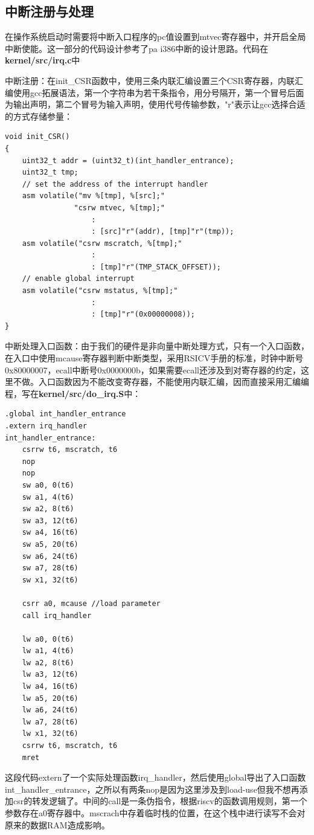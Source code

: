 \documentclass[]{article}
\begin{document}
  \subsection{中断注册与处理}
  在操作系统启动时需要将中断入口程序的pc值设置到mtvec寄存器中，并开启全局中断使能。这一部分的代码设计参考了pa i386中断的设计思路。代码在\textbf{kernel/src/irq.c}中
  
  中断注册：在init\_CSR函数中，使用三条内联汇编设置三个CSR寄存器，内联汇编使用gcc拓展语法，第一个字符串为若干条指令，用分号隔开，第一个冒号后面为输出声明，第二个冒号为输入声明，使用代号传输参数，"r"表示让gcc选择合适的方式存储参量：
  \begin{lstlisting}[style=c-style]
void init_CSR()
{
    uint32_t addr = (uint32_t)(int_handler_entrance);
    uint32_t tmp;
    // set the address of the interrupt handler
    asm volatile("mv %[tmp], %[src];"
                "csrw mtvec, %[tmp];"
                    :
                    : [src]"r"(addr), [tmp]"r"(tmp));
    asm volatile("csrw mscratch, %[tmp];"
                    :
                    : [tmp]"r"(TMP_STACK_OFFSET));
    // enable global interrupt
    asm volatile("csrw mstatus, %[tmp];"
                    :
                    : [tmp]"r"(0x00000008));
}
    \end{lstlisting}  
    
    中断处理入口函数：由于我们的硬件是非向量中断处理方式，只有一个入口函数，在入口中使用mcause寄存器判断中断类型，采用RSICV手册的标准，时钟中断号0x80000007，ecall中断号0x0000000b，如果需要ecall还涉及到对寄存器的约定，这里不做。入口函数因为不能改变寄存器，不能使用内联汇编，因而直接采用汇编编程，写在\textbf{kernel/src/do\_irq.S}中：
  \begin{lstlisting}[style=c-style]
.global int_handler_entrance
.extern irq_handler
int_handler_entrance: 
    csrrw t6, mscratch, t6
    nop
    nop
    sw a0, 0(t6)
    sw a1, 4(t6)
    sw a2, 8(t6)
    sw a3, 12(t6)
    sw a4, 16(t6)
    sw a5, 20(t6)
    sw a6, 24(t6)
    sw a7, 28(t6)
    sw x1, 32(t6)
    
    csrr a0, mcause //load parameter
    call irq_handler

    lw a0, 0(t6)
    lw a1, 4(t6)
    lw a2, 8(t6)
    lw a3, 12(t6)
    lw a4, 16(t6)
    lw a5, 20(t6)
    lw a6, 24(t6)
    lw a7, 28(t6)
    lw x1, 32(t6)
    csrrw t6, mscratch, t6
    mret
    \end{lstlisting}      
    这段代码extern了一个实际处理函数irq\_handler，然后使用global导出了入口函数int\_handler\_entrance，之所以有两条nop是因为这里涉及到load-use但我不想再添加csr的转发逻辑了。中间的call是一条伪指令，根据riscv的函数调用规则，第一个参数存在a0寄存器中。mscrach中存着临时栈的位置，在这个栈中进行读写不会对原来的数据RAM造成影响。
    
\end{document}
